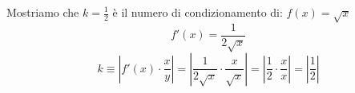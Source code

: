 Mostriamo che  $k=\frac{1}{2}$ è il numero di condizionamento di:  $f(x) = \sqrt{x}$
\[
f'(x) = \frac{1}{2\sqrt{x}}
\]
\[
k \equiv |f'(x) \cdot \frac{x}{y} | = | \frac{1}{2\sqrt{x}} \cdot \frac{x}{ \sqrt{x} } | = | \frac{1}{2} \cdot \frac{x}{x} | = | \frac{1}{2}|
\]
